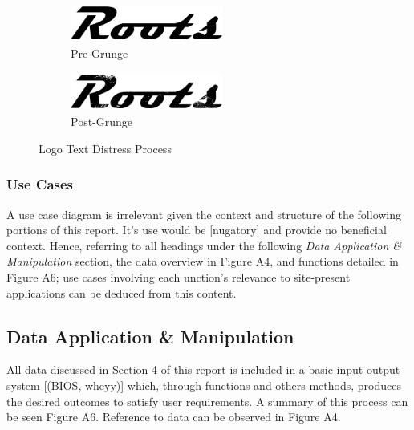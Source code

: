 \documentclass[11pt, english]{article}
\begin{document}
	\begin{figure}[H]
	\begin{center}
		\begin{subfigure}[t]{6cm}
                \begin{center}
                        \includegraphics[width=5cm,height=1.25cm]{../Promotional/Photos/roots2.png}
                \end{center}
                        \caption{Pre-Grunge}
                \end{subfigure}
                \begin{subfigure}[t]{6cm}
                \begin{center}
                        \includegraphics[width=5cm,height=1.25cm]{../Promotional/Photos/Roots2.png}
                \end{center}
                        \caption{Post-Grunge}
                \end{subfigure}
		\caption{Logo Text Distress Process}
	\end{center}
	\end{figure}

		\subsubsection{Use Cases}

	A use case diagram is irrelevant given the context and structure of the following portions of this report. It's use would be [nugatory] and provide no beneficial context. Hence, referring to all headings under the following \textit{Data Application \& Manipulation} section, the data overview in Figure A4, and functions detailed in Figure A6; use cases involving each unction's relevance to site-present applications can be deduced from this content.

	\subsection{Data Application \& Manipulation}

	All data discussed in Section 4 of this report is included in a basic input-output system [(BIOS, wheyy)] which, through functions and others methods, produces the desired outcomes to satisfy user requirements. A summary of this process can be seen Figure A6. Reference to data can be observed in Figure A4.
\end{document}
